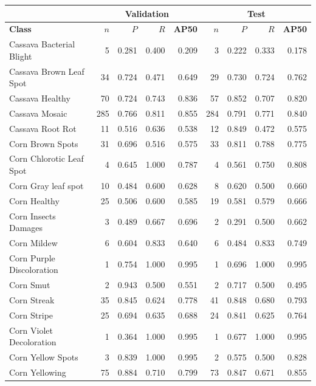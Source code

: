 \documentclass[a4paper,8pt]{article}
\begin{document}
\begin{table}[H]
\centering
\scriptsize
\renewcommand{\arraystretch}{1.1}
\begin{tabularx}{\textwidth}{|>{\raggedright\arraybackslash}X|r|r|r|r||r|r|r|r|}
\hline
& \multicolumn{4}{c||}{\textbf{Validation}} & \multicolumn{4}{c|}{\textbf{Test}}\\
\cline{2-9}
\textbf{Class} & \textbf{$n$} & \textbf{$P$} & \textbf{$R$} & \textbf{AP50} &
\textbf{$n$} & \textbf{$P$} & \textbf{$R$} & \textbf{AP50}\\
\hline
Cassava Bacterial Blight & 5 & 0.281 & 0.400 & 0.209 & 3 & 0.222 & 0.333 & 0.178\\
Cassava Brown Leaf Spot & 34 & 0.724 & 0.471 & 0.649 & 29 & 0.730 & 0.724 & 0.762\\
Cassava Healthy & 70 & 0.724 & 0.743 & 0.836 & 57 & 0.852 & 0.707 & 0.820\\
Cassava Mosaic & 285 & 0.766 & 0.811 & 0.855 & 284 & 0.791 & 0.771 & 0.840\\
Cassava Root Rot & 11 & 0.516 & 0.636 & 0.538 & 12 & 0.849 & 0.472 & 0.575\\
Corn Brown Spots & 31 & 0.696 & 0.516 & 0.575 & 33 & 0.811 & 0.788 & 0.775\\
Corn Chlorotic Leaf Spot & 4 & 0.645 & 1.000 & 0.787 & 4 & 0.561 & 0.750 & 0.808\\
Corn Gray leaf spot & 10 & 0.484 & 0.600 & 0.628 & 8 & 0.620 & 0.500 & 0.660\\
Corn Healthy & 25 & 0.506 & 0.600 & 0.585 & 19 & 0.581 & 0.579 & 0.666\\
Corn Insects Damages & 3 & 0.489 & 0.667 & 0.696 & 2 & 0.291 & 0.500 & 0.662\\
Corn Mildew & 6 & 0.604 & 0.833 & 0.640 & 6 & 0.484 & 0.833 & 0.749\\
Corn Purple Discoloration & 1 & 0.754 & 1.000 & 0.995 & 1 & 0.696 & 1.000 & 0.995\\
Corn Smut & 2 & 0.943 & 0.500 & 0.551 & 2 & 0.717 & 0.500 & 0.495\\
Corn Streak & 35 & 0.845 & 0.624 & 0.778 & 41 & 0.848 & 0.680 & 0.793\\
Corn Stripe & 25 & 0.694 & 0.635 & 0.688 & 24 & 0.841 & 0.625 & 0.764\\
Corn Violet Decoloration & 1 & 0.364 & 1.000 & 0.995 & 1 & 0.677 & 1.000 & 0.995\\
Corn Yellow Spots & 3 & 0.839 & 1.000 & 0.995 & 2 & 0.575 & 0.500 & 0.828\\
Corn Yellowing & 75 & 0.884 & 0.710 & 0.799 & 73 & 0.847 & 0.671 & 0.855\\

\end{tabularx}
\end{table}
\end{document}
